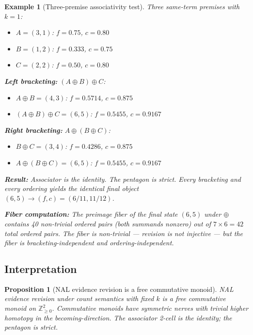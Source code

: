 \documentclass[11pt]{article}
\newtheorem{proposition}{Proposition}
\newtheorem{example}{Example}
\begin{document}
\begin{example}[Three-premise associativity test]
\label{ex:nal-test}
Three same-term premises with $k = 1$:
\begin{itemize}
  \item $A = (3, 1)$: $f = 0.75$, $c = 0.80$
  \item $B = (1, 2)$: $f = 0.333$, $c = 0.75$
  \item $C = (2, 2)$: $f = 0.50$, $c = 0.80$
\end{itemize}

\textbf{Left bracketing:} $(A \oplus B) \oplus C$:
\begin{itemize}
  \item $A \oplus B = (4, 3)$: $f = 0.5714$, $c = 0.875$
  \item $(A \oplus B) \oplus C = (6, 5)$: $f = 0.5455$, $c = 0.9167$
\end{itemize}

\textbf{Right bracketing:} $A \oplus (B \oplus C)$:
\begin{itemize}
  \item $B \oplus C = (3, 4)$: $f = 0.4286$, $c = 0.875$
  \item $A \oplus (B \oplus C) = (6, 5)$: $f = 0.5455$, $c = 0.9167$
\end{itemize}

\textbf{Result:} Associator is the identity. The pentagon is strict. Every bracketing and
every ordering yields the identical final object $(6, 5) \to (f, c) = (6/11, 11/12)$.

\textbf{Fiber computation:} The preimage fiber of the final state $(6, 5)$ under $\oplus$
contains 40 non-trivial ordered pairs (both summands nonzero) out of $7 \times 6 = 42$ total
ordered pairs. The fiber is non-trivial --- revision is not injective --- but the fiber is
\emph{bracketing-independent} and \emph{ordering-independent}.
\end{example}

\subsection{Interpretation}

\begin{proposition}[NAL evidence revision is a free commutative monoid]
\label{prop:nal-monoid}
NAL evidence revision under count semantics with fixed $k$ is a free commutative monoid on
$\mathbb{Z}_{\geq 0}^2$. Commutative monoids have symmetric nerves with trivial higher homotopy
in the becoming-direction. The associator 2-cell is the identity; the pentagon is strict.
\end{proposition}
\end{document}
